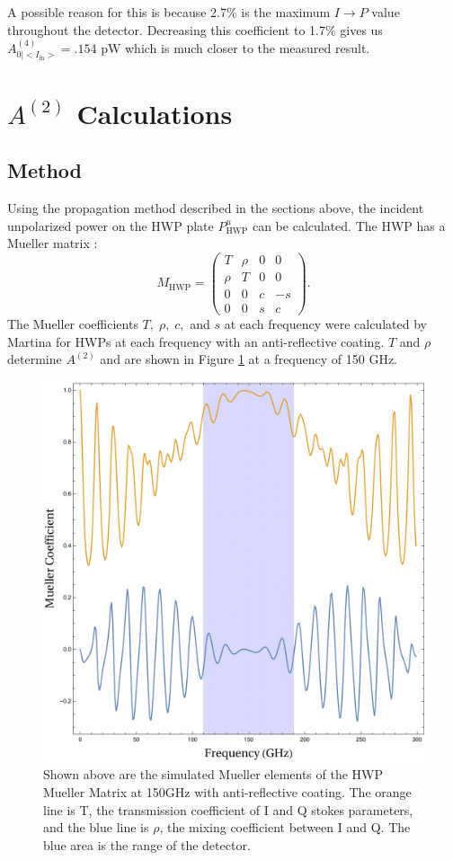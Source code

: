 \documentclass{article}
\theoremstyle{remark}
\newcommand{\tab}{\hspace*{2em}}
\renewcommand{\t}[1]{\text{#1}}
\newcommand{\AI}{A^{(4)}_{0|<I_{\t{in}}>}}
\newcommand{\A}[1]{A^{(#1)}}
\newcommand{\ip}{$I\rightarrow P$ }
\begin{document}
\tab A possible reason for this is because 2.7\% is the maximum \ip value throughout the detector. 
Decreasing this coefficient to 1.7\% gives us $\AI = .154 \t{ pW}$ which is much closer to the measured result.



\section*{$A^{(2)}$ Calculations}
\subsection*{Method} 
\tab Using the propagation method described in the sections above, the incident unpolarized power on the HWP plate $P^u_\t{HWP}$ can be calculated. 
The HWP has a Mueller matrix :
\[
M_\t{HWP} = \left(
\begin{array}{cccc}
T & \rho & 0 & 0 \\
\rho & T & 0 & 0 \\
0 & 0 & c & -s\\
0 & 0 & s & c
\end{array}
\right).
\]
The Mueller coefficients $T,\; \rho,\;c,$ and $s$ at each frequency were calculated by Martina for HWPs at each frequency with an anti-reflective coating.
$T$ and $\rho$ determine $\A2$ and are shown in Figure \ref{fig:Mueller_Elements} at a frequency of 150 GHz.

\begin{figure}[t!]
	\centering
  \includegraphics[width=.6\linewidth]{images/Mueller_150GHz.pdf}
  \caption{Shown above are the simulated Mueller elements of the HWP Mueller Matrix at 150GHz with anti-reflective coating. 
  	The orange line is T, the transmission coefficient of I and Q stokes parameters, and the blue line is 
  	$\rho$, the mixing coefficient between I and Q. The blue area is the range of the detector.}
  \label{fig:Mueller_Elements}
\end{figure}
\end{document}

